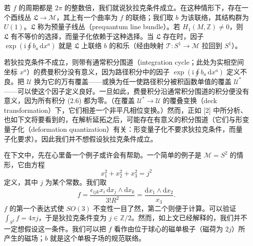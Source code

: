\documentclass[11pt,a4paper,UTF8]{ctexart}
\theoremstyle{plain}
\theoremstyle{definition}
\begin{document}
若 $f$ 的周期都是 $2\pi$ 的整数倍，我们就说狄拉克条件成立。在这种情形下，存在一个酉线丛 $\mathfrak{L}\to\mathcal{M}$，其上有一个曲率为 $f$ 的联络；我们取 $b$ 为该联络，其结构群为 $U(1)$。$\mathfrak{L}$ 称为预量子线丛（prequantum line bundle）。若 $H_1(M,\mathbb{Z})\neq0$，则 $\mathfrak{L}$ 有不等价的选择，而量子化依赖于这种选择。当 $\mathfrak{L}$ 存在时，因子 $\exp(\mathrm{i}\oint b_a\,\mathrm{d}x^a)$ 就是 $\mathfrak{L}$ 上联络 $b$ 的和乐（经由映射 $\mathcal{T}:S^1\to\mathcal{M}$ 拉回到 $S^1$）。


若狄拉克条件不成立，则带有通常积分围道（integration cycle；此处为实相空间坐标 $x^a$）的费曼积分没有意义，因为路径积分中的因子 $\exp(\mathrm{i}\oint b_a\,\mathrm{d}x^a)$ 定义不良。把 $\mathcal{U}$ 换为它的万有覆盖——或换为任一使路径积分被积函数单值的覆盖 $\mathcal{U}^*$——可以使这个因子定义良好。一旦如此，费曼积分沿通常积分围道的积分便没有意义，因为所有积分 (2.6) 都为零。（在覆盖 $\mathcal{U}^*\to\mathcal{U}$ 的覆叠变换（deck transformation）下，它们相差一个非平凡相位变换。）然而，正如 [2] 中所分析、也如下文将要看到的，在解析延拓之后，可能存在有意义的积分围道（它们与形变量子化（deformation quantization）有关：形变量子化不要求狄拉克条件，而量子化要求）。因此我们并不想假设狄拉克条件成立。


在下文中，先在心里备一个例子或许会有帮助。一个简单的例子是 $\mathcal{M}=S^2$ 的情形，它由方程
\begin{equation}
    x_1^2+x_2^2+x_3^2 = j^2
    \tag{2.9}
\end{equation}
定义，其中 $j$ 为某个常数。我们取
\begin{equation}
    f = \frac{\epsilon_{ijk}x_i\,\mathrm{d}x_j\wedge\mathrm{d}x_k}{3!R^2}
    = \frac{\mathrm{d}x_1\wedge\mathrm{d}x_2}{x_3}.
    \tag{2.10}
\end{equation}
$f$ 的第一个表达式使 $SO(3)$ 不变性一目了然，第二个则便于计算。可以验证 $\int_{S^2}f=4\pi j$，于是狄拉克条件变为 $j\in\mathbb{Z}/2$。然而，如上文已经解释的，我们并不一定想假设这一条件。我们可以把 $f$ 看作由位于球心的磁单极子（磁荷为 $2j$）所产生的磁场；$b$ 就是这个单极子场的规范联络。
\end{document}
